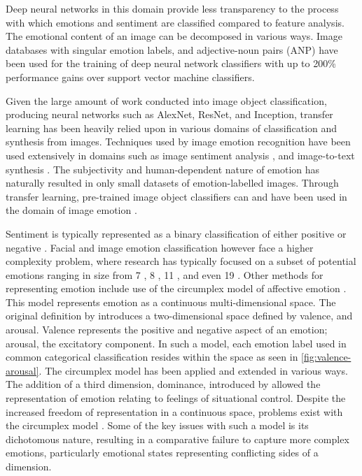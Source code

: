 \documentclass{article}
\begin{document}
Deep neural networks in this domain provide less transparency to the process with which emotions and sentiment are classified compared to feature analysis.
The emotional content of an image can be decomposed in various ways.
Image databases with singular emotion labels, and adjective-noun pairs (ANP) have been used for the training of deep neural network classifiers \citep{chen2014deepsentibank, yang2018visual} with up to 200\% performance gains over support vector machine classifiers.

Given the large amount of work conducted into image object classification, producing neural networks such as AlexNet, ResNet, and Inception, transfer learning has been heavily relied upon in various domains of classification and synthesis from images.
Techniques used by image emotion recognition have been used extensively in domains such as image sentiment analysis \citep{you2015robust}, and image-to-text synthesis \citep{vinyals2015show}.
The subjectivity and human-dependent nature of emotion has naturally resulted in only small datasets of emotion-labelled images.
Through transfer learning, pre-trained image object classifiers can and have been used in the domain of image emotion \citep{kim2018building, wangarttalk}.

Sentiment is typically represented as a binary classification of either positive or negative \citep{yang2018visual, chen2014deepsentibank}.
Facial and image emotion classification however face a higher complexity problem, where research has typically focused on a subset of potential emotions ranging in size from 7 \citep{ali2017emotional}, 8 \citep{machajdik2010affective}, 11 \citep{wangarttalk}, and even 19 \citep{mohammad2018wikiart}.
Other methods for representing emotion include use of the circumplex model of affective emotion \citep{russell1980circumplex, bradley1994measuring}.
This model represents emotion as a continuous multi-dimensional space.
The original definition by \citet{russell1980circumplex} introduces a two-dimensional space defined by valence, and arousal.
Valence represents the positive and negative aspect of an emotion; arousal, the excitatory component.
In such a model, each emotion label used in common categorical classification resides within the space as seen in \ref{fig:valence-arousal}.
The circumplex model has been applied and extended in various ways.
The addition of a third dimension, dominance, introduced by \citet{bradley1994measuring} allowed the representation of emotion relating to feelings of situational control.
Despite the increased freedom of representation in a continuous space, problems exist with the circumplex model \citep{larsen1992promises}.
Some of the key issues with such a model is its dichotomous nature, resulting in a comparative failure to capture more complex emotions, particularly emotional states representing conflicting sides of a dimension.
\end{document}
